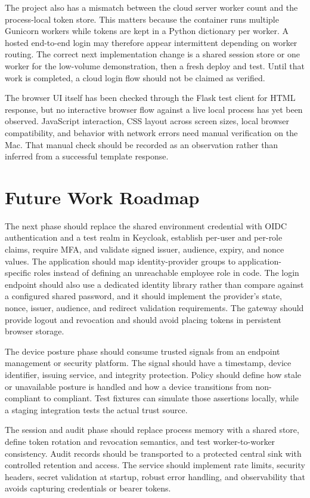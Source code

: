 The project also has a mismatch between the cloud server worker count and the process-local token store. This matters because the container runs multiple Gunicorn workers while tokens are kept in a Python dictionary per worker. A hosted end-to-end login may therefore appear intermittent depending on worker routing. The correct next implementation change is a shared session store or one worker for the low-volume demonstration, then a fresh deploy and test. Until that work is completed, a cloud login flow should not be claimed as verified.

The browser UI itself has been checked through the Flask test client for HTML response, but no interactive browser flow against a live local process has yet been observed. JavaScript interaction, CSS layout across screen sizes, local browser compatibility, and behavior with network errors need manual verification on the Mac. That manual check should be recorded as an observation rather than inferred from a successful template response.

\section{Future Work Roadmap}
The next phase should replace the shared environment credential with OIDC authentication and a test realm in Keycloak, establish per-user and per-role claims, require MFA, and validate signed issuer, audience, expiry, and nonce values. The application should map identity-provider groups to application-specific roles instead of defining an unreachable employee role in code. The login endpoint should also use a dedicated identity library rather than compare against a configured shared password, and it should implement the provider's state, nonce, issuer, audience, and redirect validation requirements. The gateway should provide logout and revocation and should avoid placing tokens in persistent browser storage.

The device posture phase should consume trusted signals from an endpoint management or security platform. The signal should have a timestamp, device identifier, issuing service, and integrity protection. Policy should define how stale or unavailable posture is handled and how a device transitions from non-compliant to compliant. Test fixtures can simulate those assertions locally, while a staging integration tests the actual trust source.

The session and audit phase should replace process memory with a shared store, define token rotation and revocation semantics, and test worker-to-worker consistency. Audit records should be transported to a protected central sink with controlled retention and access. The service should implement rate limits, security headers, secret validation at startup, robust error handling, and observability that avoids capturing credentials or bearer tokens.

